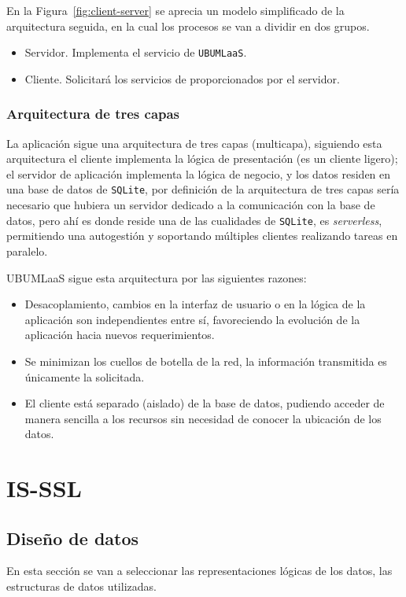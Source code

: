 En la Figura~\ref{fig:client-server} se aprecia un modelo simplificado de la arquitectura seguida, en la cual los procesos se van a dividir en dos grupos. 
\begin{itemize}
\item Servidor. Implementa el servicio de \texttt{UBUMLaaS}.
\item Cliente. Solicitará los servicios de proporcionados por el servidor.
\end{itemize}

\subsubsection{Arquitectura de tres capas}
La aplicación sigue una arquitectura de tres capas (multicapa), siguiendo esta arquitectura el cliente implementa la lógica de presentación (es un cliente ligero); el servidor de aplicación implementa la lógica de negocio, y los datos residen en una base de datos de \texttt{SQLite}, por definición de la arquitectura de tres capas sería necesario que hubiera un servidor dedicado a la comunicación con la base de datos, pero ahí es donde reside una de las cualidades de \texttt{SQLite}, es \textit{serverless}, permitiendo una autogestión y soportando múltiples clientes realizando tareas en paralelo.

UBUMLaaS sigue esta arquitectura por las siguientes razones:
\begin{itemize}
\item Desacoplamiento, cambios en la interfaz de usuario o en la lógica de la aplicación son independientes entre sí, favoreciendo la evolución de la aplicación hacia nuevos requerimientos.
\item Se minimizan los cuellos de botella de la red, la información transmitida es únicamente la solicitada.
\item El cliente está separado (aislado) de la base de datos, pudiendo acceder de manera sencilla a los recursos sin necesidad de conocer la ubicación de los datos.
\end{itemize}

\FloatBarrier
\section{IS-SSL}
\subsection{Diseño de datos}
En esta sección se van a seleccionar las representaciones lógicas de los datos, las estructuras de datos utilizadas.

